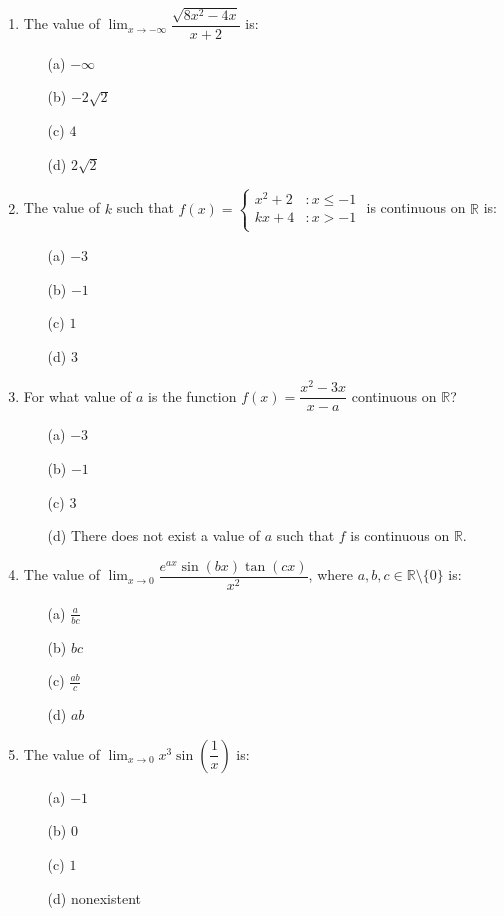 \documentclass[12pt]{book}
\begin{document}
\begin{enumerate}
\item The value of $\lim_{x\to -\infty}\limits \dfrac{\sqrt{8x^2 - 4x}}{x+2}$ is:
\begin{enumerate}
\item[(a)] $-\infty$
\item[(b)] $-2\sqrt{2}$
\item[(c)] $4$
\item[(d)] $2\sqrt{2}$
\end{enumerate}


\newpage

\item The value of $k$ such that $f(x) = \begin{cases} 
      x^2 + 2 & : x \le -1 \\
      kx+4 & : x>-1 \\
   \end{cases}$ is continuous on $\mathbb{R}$ is: 
\begin{enumerate}
\item[(a)] $-3$
\item[(b)] $-1$
\item[(c)] $1$
\item[(d)] $3$
\end{enumerate}

\item For what value of $a$ is the function $f(x) = \dfrac{x^2 - 3x}{x-a}$ continuous on $\mathbb{R}$?
\begin{enumerate}
\item[(a)] $-3$
\item[(b)] $-1$
\item[(c)] $3$
\item[(d)] There does not exist a value of $a$ such that $f$ is continuous on $\mathbb{R}$.
\end{enumerate}

\item The value of $\lim_{x\to 0}\limits \dfrac{e^{ax} \sin(bx) \tan(cx)}{x^2}$, where $a,b,c \in \mathbb{R}\setminus\{0\}$ is:
\begin{enumerate}
\item[(a)] $\frac{a}{bc}$
\item[(b)] $bc$
\item[(c)] $\frac{ab}{c}$
\item[(d)] $ab$
\end{enumerate}

\item The value of $\lim_{x\to 0}\limits x^3 \sin\left(\dfrac{1}{x}\right)$ is:
\begin{enumerate}
\item[(a)] $-1$
\item[(b)] $0$
\item[(c)] $1$
\item[(d)] nonexistent
\end{enumerate}


\end{enumerate}
\end{document}

